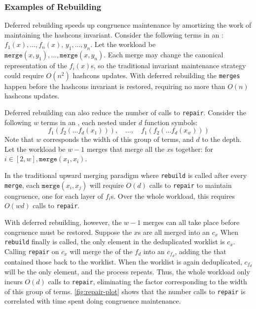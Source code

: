 \subsubsection{Examples of Rebuilding}

Deferred rebuilding speeds up congruence maintenance by amortizing the work of
  maintaining the hashcons invariant.
Consider the following terms in an \egraph:
  $f_{1}(x), ..., f_{n}(x),\, y_{1}, ..., y_{n}$.
Let the workload be $\texttt{merge}(x, y_{1}), ..., \texttt{merge}(x, y_{n})$.
Each merge may change the canonical representation of the $f_{i}(x)$s,
  so the traditional invariant maintenance strategy
  could require $O(n^{2})$ hashcons updates.
With deferred rebuilding the \texttt{merges} happen before
  the hashcons invariant is restored,
  requiring no more than $O(n)$ hashcons updates.

Deferred rebuilding can also reduce the number of calls to \texttt{repair}.
Consider the following $w$ terms in an \egraph,
  each nested under $d$ function symbols:
  $$f_1 (f_2(\ldots f_d(x_1))), \quad\ldots,\quad f_1(f_2(\ldots f_d(x_w)))$$
Note that $w$ corresponds the width of this group of terms, and $d$ to the depth.
Let the workload be $w-1$ merges that merge all the $x$s together:
  for $i \in [2, w], \texttt{merge}(x_{1}, x_{i})$.

In the traditional upward merging paradigm
  where \texttt{rebuild} is called after every \texttt{merge},
  each $\texttt{merge}(x_i, x_j)$ will require $O(d)$ calls to \texttt{repair}
  to maintain congruence, one for each layer of $f_{i}$s.
Over the whole workload, this requires $O(wd)$ calls to \texttt{repair}.

With deferred rebuilding, however, the $w-1$ merges can all take place before
  congruence must be restored.
Suppose the $x$s are all merged into an \eclass $c_{x}$
When \texttt{rebuild} finally is called,
  the only element in the deduplicated worklist is $c_{x}$.
Calling \texttt{repair} on $c_{x}$ will merge the \eclasses of the $f_{d}$
  \enodes into an \eclass $c_{f_{d}}$,
  adding the \eclasses that contained those \enodes back to the worklist.
When the worklist is again deduplicated,
  $c_{f_{d}}$ will be the only element,
  and the process repeats.
Thus, the whole workload only incurs $O(d)$ calls to \texttt{repair},
  eliminating the factor corresponding to the width of this group of terms.
\autoref{fig:repair-plot} shows that the number calls to \texttt{repair} is
  correlated with time spent doing congruence maintenance.

